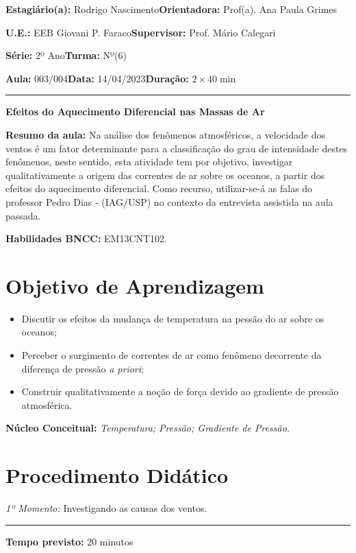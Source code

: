 \par\noindent\textbf{Estagiário(a):} Rodrigo Nascimento\hfill{}\textbf{Orientadora:} Prof(a). Ana Paula Grimes
\par\noindent\textbf{U.E.:} EEB Giovani P. Faraco\hfill{}\textbf{Supervisor:} Prof. Mário Calegari
\par\noindent\textbf{Série:} 2º Ano\hfill{}\textbf{Turma:} Nº(6)
\par\noindent\textbf{Aula:} 003/004\hfill{}\textbf{Data:} 14/04/2023\hfill{}\textbf{Duração:} $2\times 40\min$
\rule{\textwidth}{.5pt}
\bigskip{}  
\noindent
\begin{center}
	\textbf{Efeitos do Aquecimento Diferencial nas Massas de Ar}
\end{center}
\par\noindent\textbf{Resumo da aula:} Na análise dos fenômenos atmosféricos, a velocidade dos ventos é um fator determinante para a classificação do grau de intensidade destes fenômenos, neste sentido, esta atividade tem por objetivo, investigar qualitativamente a origem das correntes de ar sobre os oceanos, a partir dos efeitos do aquecimento diferencial. Como recurso, utilizar-se-á as falas do professor Pedro Dias - (IAG/USP) no contexto da entrevista assistida na aula passada. 
\par\noindent\textbf{Habilidades BNCC:} EM13CNT102.

\section*{Objetivo de Aprendizagem}
\begin{itemize}
	\item Discutir os efeitos da mudança de temperatura na pessão do ar sobre os oceanos;
	\item Perceber o surgimento de correntes de ar como fenômeno decorrente da diferença de pressão \textit{a priori};
	\item Construir qualitativamente a noção de força devido ao gradiente de pressão atmosférica.
\end{itemize}

\medskip{}

\noindent\textbf{Núcleo Conceitual:} \emph{Temperatura; Pressão; Gradiente de Pressão.}
\newpage

\section*{Procedimento Didático} 
\noindent\emph{1º Momento:} Investigando as causas dos ventos.
\par\noindent\rule{.3\textwidth}{.5pt}  
\par\noindent\textbf{Tempo previsto:} 20 minutos

